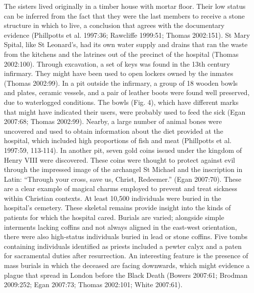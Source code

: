 \documentclass[%
	]{ijsra}
\begin{document}
The sisters lived originally in a timber house with mortar floor. Their low status can be inferred from the fact that they were the last members to receive a stone structure in which to live, a conclusion that agrees with the documentary evidence (Phillpotts et al. 1997:36; Rawcliffe 1999:51; Thomas 2002:151).
St Mary Spital, like St Leonard’s, had its own water supply and drains that ran the waste from the kitchens and the latrines out of the precinct of the hospital (Thomas 2002:100). 
\IJSRAseparator
{}
Through excavation, a set of keys was found in the 13th century infirmary. They might have been used to open lockers owned by the inmates (Thomas 2002:99). In a pit outside the infirmary, a group of 18 wooden bowls and plates, ceramic vessels, and a pair of leather boots were found well preserved, due to waterlogged conditions. The bowls (Fig. 4), which have different marks that might have indicated their users, were probably used to feed the sick (Egan 2007:68; Thomas 2002:99). Nearby, a large number of animal bones were uncovered and used to obtain information about the diet provided at the hospital, which included high proportions of fish and meat (Phillpotts et al. 1997:59, 113-114).
In another pit, seven gold coins issued under the kingdom of Henry VIII were discovered. These coins were thought to protect against evil through the impressed image of the archangel St Michael and the inscription in Latin: “Through your cross, save us, Christ, Redeemer.”  (Egan 2007:70). These are a clear example of magical charms employed to prevent and treat sickness within Christian contexts. 
At least 10,500 individuals were buried in the hospital’s cemetery. These skeletal remains provide insight into the kinds of patients for which the hospital cared.  Burials are varied; alongside simple interments lacking coffins and not always aligned in the east-west orientation, there were also high-status individuals buried in lead or stone coffins. Five tombs containing individuals identified as priests included a pewter calyx and a paten for sacramental duties after resurrection. An interesting feature is the presence of mass burials in which the deceased are facing downwards, which might evidence a plague that spread in London before the Black Death (Bowers 2007:61; Brodman 2009:252; Egan 2007:73; Thomas 2002:101; White 2007:61).
\end{document}

